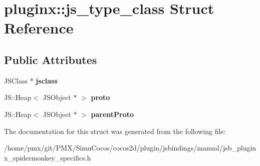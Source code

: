 \hypertarget{structpluginx_1_1js__type__class}{}\section{pluginx\+:\+:js\+\_\+type\+\_\+class Struct Reference}
\label{structpluginx_1_1js__type__class}
\subsection*{Public Attributes}
\begin{DoxyCompactItemize}
\item 
\mbox{\label{structpluginx_1_1js__type__class_a8306af90d8e2af5c443d4a0cf6e0b067}} 
J\+S\+Class $\ast$ {\bfseries jsclass}
\item 
\mbox{\label{structpluginx_1_1js__type__class_ab24693eab434620df2b4a160921d0896}} 
J\+S\+::\+Heap$<$ J\+S\+Object $\ast$ $>$ {\bfseries proto}
\item 
\mbox{\label{structpluginx_1_1js__type__class_a560cf37ae570049d08e4548eeced8a96}} 
J\+S\+::\+Heap$<$ J\+S\+Object $\ast$ $>$ {\bfseries parent\+Proto}
\end{DoxyCompactItemize}


The documentation for this struct was generated from the following file\+:\begin{DoxyCompactItemize}
\item 
/home/pmx/git/\+P\+M\+X/\+Simu\+Cocos/cocos2d/plugin/jsbindings/manual/jsb\+\_\+pluginx\+\_\+spidermonkey\+\_\+specifics.\+h\end{DoxyCompactItemize}
